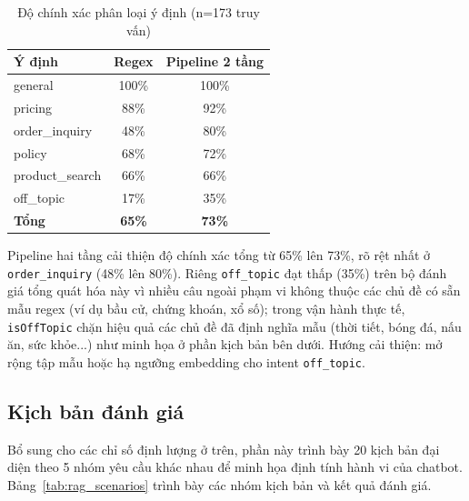 \begin{table}[H]
  \centering
  \caption{Độ chính xác phân loại ý định (n=173 truy vấn)}
  \label{tab:intent_accuracy}
  \begin{tabular}{|l|c|c|}
    \hline
    \textbf{Ý định} & \textbf{Regex} & \textbf{Pipeline 2 tầng} \\
    \hline
    general & 100\% & 100\% \\
    \hline
    pricing & 88\% & 92\% \\
    \hline
    order\_inquiry & 48\% & 80\% \\
    \hline
    policy & 68\% & 72\% \\
    \hline
    product\_search & 66\% & 66\% \\
    \hline
    off\_topic & 17\% & 35\% \\
    \hline
    \textbf{Tổng} & \textbf{65\%} & \textbf{73\%} \\
    \hline
  \end{tabular}
\end{table}

Pipeline hai tầng cải thiện độ chính xác tổng từ 65\% lên 73\%, rõ rệt nhất ở \texttt{order\_inquiry} (48\% lên 80\%). Riêng \texttt{off\_topic} đạt thấp (35\%) trên bộ đánh giá tổng quát hóa này vì nhiều câu ngoài phạm vi không thuộc các chủ đề có sẵn mẫu regex (ví dụ bầu cử, chứng khoán, xổ số); trong vận hành thực tế, \texttt{isOffTopic} chặn hiệu quả các chủ đề đã định nghĩa mẫu (thời tiết, bóng đá, nấu ăn, sức khỏe...) như minh họa ở phần kịch bản bên dưới. Hướng cải thiện: mở rộng tập mẫu hoặc hạ ngưỡng embedding cho intent \texttt{off\_topic}.

\subsection{Kịch bản đánh giá}

Bổ sung cho các chỉ số định lượng ở trên, phần này trình bày 20 kịch bản đại diện theo 5 nhóm yêu cầu khác nhau để minh họa định tính hành vi của chatbot. Bảng~\ref{tab:rag_scenarios} trình bày các nhóm kịch bản và kết quả đánh giá.

